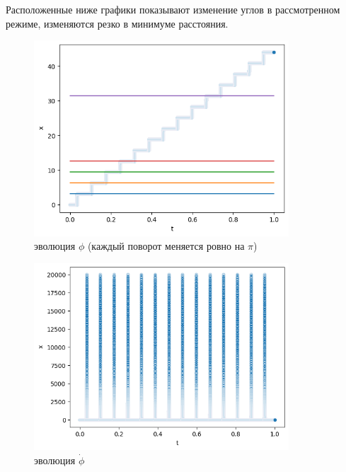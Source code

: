 \documentclass[a4paper, 12pt]{article}
\begin{document}
    \newpage
    Расположенные ниже графики показывают изменение углов в рассмотренном режиме, изменяются резко в минимуме расстояния.
    \begin{figure}[H]
  \centering
  \includegraphics[width = 0.85\textwidth, height = 0.20\textheight]{pictures/data/image copy 3_.png}
  \caption{эволюция $\phi$ (каждый поворот меняется ровно на $\pi$)}
 \end{figure}

    \begin{figure}[H]
  \centering
  \includegraphics[width = 0.85\textwidth, height = 0.20\textheight]{pictures/data/image copy 4.png}
  \caption{эволюция $\dot{\phi}$}
 \end{figure}
\end{document}

